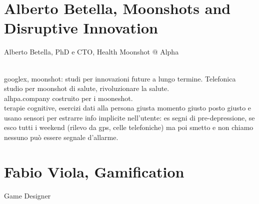 \documentclass[10pt]{article}
\begin{document}
\section{Alberto Betella, Moonshots and Disruptive Innovation}
\begin{scriptsize}
Alberto Betella, PhD e CTO, Health Moonshot @ Alpha\\\\
\end{scriptsize}
googlex, moonshot: studi per innovazioni future a lungo termine. Telefonica studio per moonshot di salute, rivoluzionare la salute.\\
alhpa.company costruito per i mooneshot.\\
terapie cognitive, esercizi dati alla persona giusta momento giusto posto giusto e usano sensori per estrarre info implicite nell'utente: es segni di pre-depressione, se esco tutti i weekend (rilevo da gps, celle telefoniche) ma poi smetto e non chiamo nessuno può essere segnale d'allarme.
\pagebreak
\section{Fabio Viola, Gamification}
Game Designer
\end{document}
